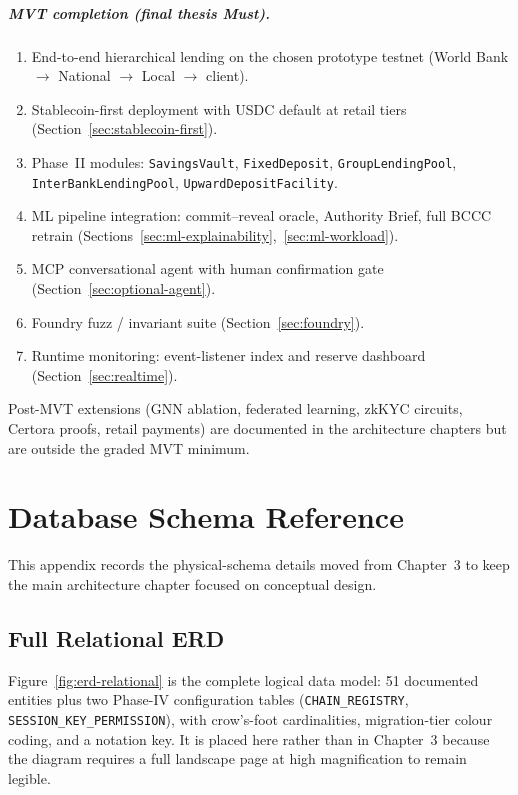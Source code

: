 \documentclass[12pt,a4paper]{report}
\begin{document}
\paragraph{MVT completion (final thesis Must).}
\begin{enumerate}[noitemsep]
\item End-to-end hierarchical lending on the chosen prototype testnet (World Bank $\to$ National $\to$ Local $\to$ client).
\item Stablecoin-first deployment with USDC default at retail tiers (Section~\ref{sec:stablecoin-first}).
\item Phase~II modules: \texttt{SavingsVault}, \texttt{FixedDeposit}, \texttt{GroupLendingPool}, \texttt{InterBankLendingPool}, \texttt{UpwardDepositFacility}.
\item ML pipeline integration: commit--reveal oracle, Authority Brief, full BCCC retrain (Sections~\ref{sec:ml-explainability},~\ref{sec:ml-workload}).
\item MCP conversational agent with human confirmation gate (Section~\ref{sec:optional-agent}).
\item Foundry fuzz / invariant suite (Section~\ref{sec:foundry}).
\item Runtime monitoring: event-listener index and reserve dashboard (Section~\ref{sec:realtime}).
\end{enumerate}

Post-MVT extensions (GNN ablation, federated learning, zkKYC circuits, Certora proofs, retail payments) are documented in the architecture chapters but are outside the graded MVT minimum.

\appendix

\chapter{Database Schema Reference}
\label{app:db-schema-reference}

This appendix records the physical-schema details moved from Chapter~3 to keep the main architecture chapter focused on conceptual design.

\section{Full Relational ERD}
\label{sec:appendix-erd-full}

Figure~\ref{fig:erd-relational} is the complete logical data model: 51 documented entities plus two Phase-IV configuration tables (\texttt{CHAIN\_REGISTRY}, \texttt{SESSION\_KEY\_PERMISSION}), with crow's-foot cardinalities, migration-tier colour coding, and a notation key. It is placed here rather than in Chapter~3 because the diagram requires a full landscape page at high magnification to remain legible.
\end{document}
